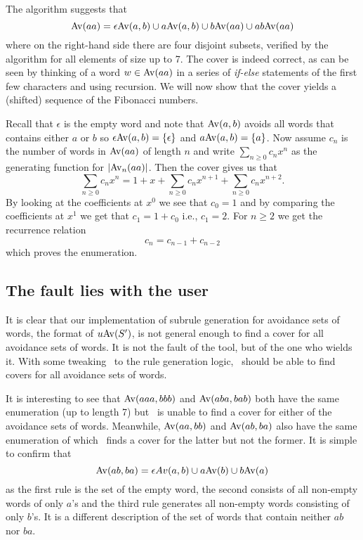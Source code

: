 The algorithm suggests that \[{\mathrm{Av}\!\left(aa\right)} = \epsilon {\mathrm{Av}\!\left(a,b\right)} \cup a {\mathrm{Av}\!\left(a,b\right)} \cup b 
{\mathrm{Av}\!\left(aa\right)} \cup ab {\mathrm{Av}\!\left(aa\right)}\] where on the right-hand side there are four disjoint 
subsets, verified by the algorithm for all elements of size up to 7. The cover is 
indeed correct, as can be seen by thinking of a word $w \in {\mathrm{Av}\!\left(aa\right)}$ in a series 
of \emph{if-else} statements of the first few characters and using recursion. 
We will now show that the cover yields a (shifted) sequence of the Fibonacci 
numbers.

Recall that $\epsilon$ is the empty word and note that ${\mathrm{Av}\!\left(a,b\right)}$ avoids all 
words that contains either $a$ or $b$ so $\epsilon {\mathrm{Av}\!\left(a,b\right)} = \{ \epsilon \}$ 
and $a {\mathrm{Av}\!\left(a,b\right)} = \{ a \}$. Now assume $c_n$ is the number of words in ${\mathrm{Av}\!\left(aa\right)}$ 
of length $n$ and write $\sum_{n \geq 0} c_n x^n$ as the generating function for 
$\left| {\mathrm{Av}_n\!\left(aa\right)} \right|$. Then the cover gives us that \[\sum_{n \geq 0} c_n 
x^n = 1 + x + \sum_{n \geq 0} c_n x^{n+1} + \sum_{n \geq 0} c_n x^{n+2} .\] By 
looking at the coefficients at $x^0$ we see that $c_0 = 1$ and by comparing the 
coefficients at $x^1$ we get that $c_1 = 1 + c_0$ i.e., $c_1 = 2$. For $n \geq 
2$ we get the recurrence relation \[ c_{n} = c_{n-1} + c_{n-2} \] which proves 
the enumeration.


\subsection{The fault lies with the user}

It is clear that our implementation of subrule generation for avoidance sets of 
words, the format of $u {\mathrm{Av}\!\left(S'\right)}$, is not general enough to find a cover for all 
avoidance sets of words. It is not the fault of the tool, but of the one who 
wields it. 
With some tweaking~\cite{guibas_string_1981} to the rule generation 
logic, \CombCov\ should be able to find covers for all avoidance sets of words.

It is interesting to see that ${\mathrm{Av}\!\left(aaa, bbb\right)}$ and ${\mathrm{Av}\!\left(aba, bab\right)}$ both have the 
same enumeration (up to length 7) but \CombCov\ is unable to find a cover for 
either of the avoidance sets of words. Meanwhile, ${\mathrm{Av}\!\left(aa, bb\right)}$ and 
${\mathrm{Av}\!\left(ab, ba\right)}$ also have the same enumeration of which \CombCov\ finds a cover 
for the latter but not the former. It is simple to confirm that \[{\mathrm{Av}\!\left(ab, ba\right)} = 
\epsilon Av(a,b)\cup a {\mathrm{Av}\!\left(b\right)} \cup b {\mathrm{Av}\!\left(a\right)}\] as the first rule is the set of 
the empty word, the second consists of all non-empty words of only $a$'s and the 
third rule generates all non-empty words consisting of only $b$'s. It is a 
different description of the set of words that contain neither $ab$ nor $ba$.
